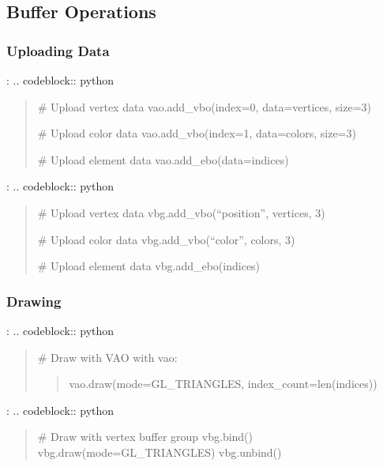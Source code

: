 \documentclass[a4paper,10pt,english,openany,oneside]{sphinxmanual}
\begin{document}
\subsection{Buffer Operations}
\label{\detokenize{api/buffers:buffer-operations}}

\subsubsection{Uploading Data}
\label{\detokenize{api/buffers:uploading-data}}
\sphinxAtStartPar
{}:
.. code\sphinxhyphen{}block:: python
\begin{quote}

\sphinxAtStartPar
\# Upload vertex data
vao.add\_vbo(index=0, data=vertices, size=3)

\sphinxAtStartPar
\# Upload color data
vao.add\_vbo(index=1, data=colors, size=3)

\sphinxAtStartPar
\# Upload element data
vao.add\_ebo(data=indices)
\end{quote}

\sphinxAtStartPar
{}:
.. code\sphinxhyphen{}block:: python
\begin{quote}

\sphinxAtStartPar
\# Upload vertex data
vbg.add\_vbo(“position”, vertices, 3)

\sphinxAtStartPar
\# Upload color data
vbg.add\_vbo(“color”, colors, 3)

\sphinxAtStartPar
\# Upload element data
vbg.add\_ebo(indices)
\end{quote}


\subsubsection{Drawing}
\label{\detokenize{api/buffers:drawing}}
\sphinxAtStartPar
{}:
.. code\sphinxhyphen{}block:: python
\begin{quote}

\sphinxAtStartPar
\# Draw with VAO
with vao:
\begin{quote}

\sphinxAtStartPar
vao.draw(mode=GL\_TRIANGLES, index\_count=len(indices))
\end{quote}
\end{quote}

\sphinxAtStartPar
{}:
.. code\sphinxhyphen{}block:: python
\begin{quote}

\sphinxAtStartPar
\# Draw with vertex buffer group
vbg.bind()
vbg.draw(mode=GL\_TRIANGLES)
vbg.unbind()
\end{quote}
\end{document}
